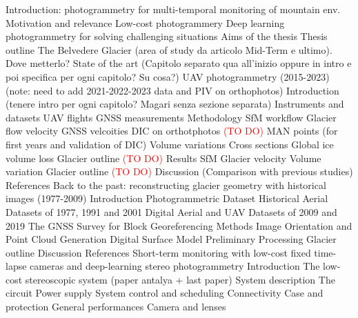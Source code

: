 \documentclass[12pt]{article}
\begin{document}
\begin{outline}[enumerate]
    \1 Introduction: photogrammetry for multi-temporal monitoring of mountain env.
        \2 Motivation and relevance
        \2 Low-cost photogrammery
        \2 Deep learning photogrammetry for solving challenging situations
        \2 Aims of the thesis
        \2 Thesis outline 
    \1 The Belvedere Glacier {\color{red}(area of study da articolo Mid-Term e ultimo). Dove metterlo?}
    \1 State of the art {\color{red}(Capitolo separato qua all'inizio oppure in intro e poi specifica per ogni capitolo? Su cosa?)}
    \1 UAV photogrammetry (2015-2023) {\color{red} (note: need to add 2021-2022-2023 data and PIV on orthophotos)}
        \2 Introduction {\color{red}(tenere intro per ogni capitolo? Magari senza sezione separata)}
        \2 Instruments and datasets
            \3 UAV flights
            \3 GNSS measurements
        \2 Methodology
            \3 SfM workflow
            \3 Glacier flow velocity
                \4 GNSS velcoities 
                \4 DIC on orthotphotos \textcolor{red}{(TO DO)}
                \4 MAN points (for first years and validation of DIC)
            \3 Volume variations
                \4 Cross sections
                \4 Global ice volume loss
            \3 Glacier outline \textcolor{red}{(TO DO)}
        \2 Results
            \3 SfM
            \3 Glacier velocity
            \3 Volume variation
            \3 Glacier outline \textcolor{red}{(TO DO)}
        \2 Discussion (Comparison with previous studies)
        \2 References
    \1 Back to the past: reconstructing glacier geometry with historical images (1977-2009)
        \2 Introduction
        \2 Photogrammetric Dataset
            \3 Historical Aerial Datasets of 1977, 1991 and 2001
            \3 Digital Aerial and UAV Datasets of 2009 and 2019
            \3 The GNSS Survey for Block Georeferencing
        \2 Methods
            \3 Image Orientation and Point Cloud Generation
            \3 Digital Surface Model Preliminary Processing
            \3 Glacier outline
        \2 Discussion
        \2 References
    \1 Short-term monitoring with low-cost fixed time-lapse cameras and deep-learning stereo photogrammetry
        \2 Introduction 
        \2 The low-cost stereoscopic system {\color{red} (paper antalya + last paper)}
            \3 System description
                \4 The circuit
                \4 Power supply
                \4 System control and scheduling
                \4 Connectivity 
                \4 Case and protection
                \4 General performances
            \3 Camera and lenses

\end{outline}
\end{document}
